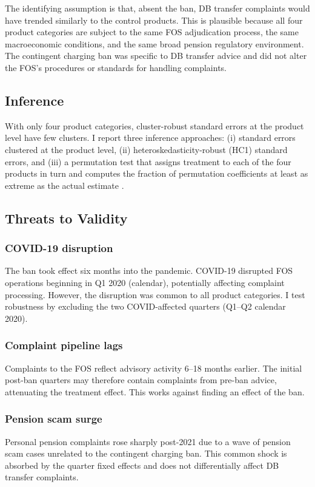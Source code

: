 \documentclass[12pt]{article}
\begin{document}
The identifying assumption is that, absent the ban, DB transfer complaints would have trended similarly to the control products. This is plausible because all four product categories are subject to the same FOS adjudication process, the same macroeconomic conditions, and the same broad pension regulatory environment. The contingent charging ban was specific to DB transfer advice and did not alter the FOS's procedures or standards for handling complaints.

\subsection{Inference}

With only four product categories, cluster-robust standard errors at the product level have few clusters. I report three inference approaches: (i) standard errors clustered at the product level, (ii) heteroskedasticity-robust (HC1) standard errors, and (iii) a permutation test that assigns treatment to each of the four products in turn and computes the fraction of permutation coefficients at least as extreme as the actual estimate \citep{fisher1935}.

\subsection{Threats to Validity}

\subsubsection*{COVID-19 disruption} The ban took effect six months into the pandemic. COVID-19 disrupted FOS operations beginning in Q1 2020 (calendar), potentially affecting complaint processing. However, the disruption was common to all product categories. I test robustness by excluding the two COVID-affected quarters (Q1--Q2 calendar 2020).

\subsubsection*{Complaint pipeline lags} Complaints to the FOS reflect advisory activity 6--18 months earlier. The initial post-ban quarters may therefore contain complaints from pre-ban advice, attenuating the treatment effect. This works against finding an effect of the ban.

\subsubsection*{Pension scam surge} Personal pension complaints rose sharply post-2021 due to a wave of pension scam cases unrelated to the contingent charging ban. This common shock is absorbed by the quarter fixed effects and does not differentially affect DB transfer complaints.
\end{document}
